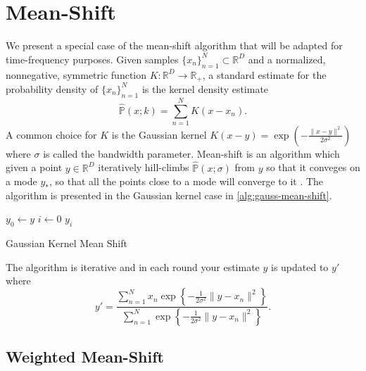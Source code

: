 \documentclass[english]{article}
\begin{document}
\section{Mean-Shift}

We present a special case of the mean-shift algorithm that will be adapted for time-frequency purposes.
Given samples $\{x_n\}_{n=1}^N\subset \mathbb{R}^D$ and a normalized, nonnegative, symmetric function $K\colon \mathbb{R}^D\to\mathbb{R}_+$,
a standard estimate for the  probability density of $\{x_n\}_{n=1}^N$ is the kernel density estimate
\begin{equation}
\hat{\mathbb{P}}(x ; k) = \sum_{n=1}^N K(x-x_n).
\end{equation}
A common choice for $K$ is the Gaussian kernel $K(x-y)=\exp\left(-\frac{\|x-y\|^2}{2\sigma^2}\right)$ where
$\sigma$ is called the bandwidth parameter.  Mean-shift is an algorithm which given a point $y\in\mathbb{R}^D$
iteratively hill-climbs
$\hat{\mathbb{P}}(x ; \sigma)$ from $y$ so that it conveges on a mode $y_*$, so that all the points close to
a mode will converge to it \cite{fukunaga75,chengms95,Comaniciu02}. The algorithm is presented in the 
Gaussian kernel case in \autoref{alg:gauss-mean-shift}.
\begin{algorithm}[t]
\SetAlgoNoLine
{}

$y_0\leftarrow y$\;
$i\leftarrow 0$\;
\Return  $y_i$\;
\caption{Gaussian Kernel Mean Shift}
\label{alg:gauss-mean-shift}
\end{algorithm}
The algorithm is iterative and in each round your estimate $y$ is updated to $y'$ where
\begin{equation}\label{eq:mean-shift-step}
y' = \frac{\sum_{n=1}^N x_n \exp\left\{-\frac{1}{2\sigma^2}\|y-x_n\|^2\right\}}{\sum_{n=1}^N \exp\left\{-\frac{1}{2\sigma^2}\|y-x_n\|^2\right\}}.
\end{equation}

\subsection{Weighted Mean-Shift}
\end{document}
